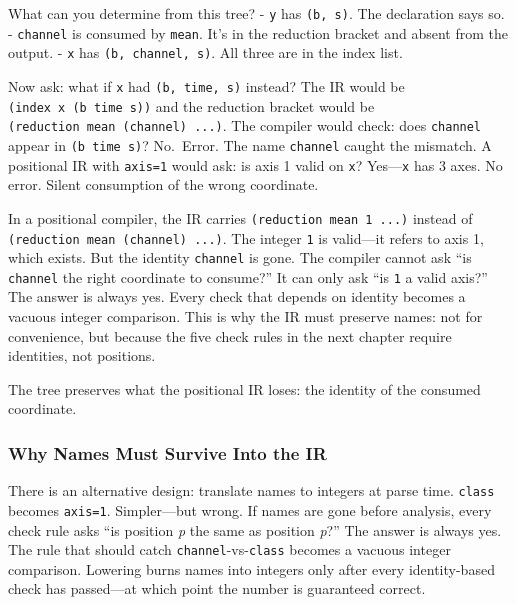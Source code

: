 \documentclass[11pt,titlepage]{article}
\begin{document}
What can you determine from this tree? - \texttt{y} has
\texttt{(b,\ s)}. The declaration says so. - \texttt{channel} is
consumed by \texttt{mean}. It's in the reduction bracket and absent from
the output. - \texttt{x} has \texttt{(b,\ channel,\ s)}. All three are
in the index list.

Now ask: what if \texttt{x} had \texttt{(b,\ time,\ s)} instead? The IR
would be \texttt{(index\ x\ (b\ time\ s))} and the reduction bracket
would be \texttt{(reduction\ mean\ (channel)\ ...)}. The compiler would
check: does \texttt{channel} appear in \texttt{(b\ time\ s)}? No.~Error.
The name \texttt{channel} caught the mismatch. A positional IR with
\texttt{axis=1} would ask: is axis 1 valid on \texttt{x}?
Yes---\texttt{x} has 3 axes. No error. Silent consumption of the wrong
coordinate.

In a positional compiler, the IR carries
\texttt{(reduction\ mean\ 1\ ...)} instead of
\texttt{(reduction\ mean\ (channel)\ ...)}. The integer \texttt{1} is
valid---it refers to axis 1, which exists. But the identity
\texttt{channel} is gone. The compiler cannot ask ``is \texttt{channel}
the right coordinate to consume?'' It can only ask ``is \texttt{1} a
valid axis?'' The answer is always yes. Every check that depends on
identity becomes a vacuous integer comparison. This is why the IR must
preserve names: not for convenience, but because the five check rules in
the next chapter require identities, not positions.

The tree preserves what the positional IR loses: the identity of the
consumed coordinate.

\vspace{2em}

\hypertarget{why-names-must-survive-into-the-ir}{%
\subsubsection{Why Names Must Survive Into the
IR}\label{why-names-must-survive-into-the-ir}}

There is an alternative design: translate names to integers at parse
time. \texttt{class} becomes \texttt{axis=1}. Simpler---but wrong. If
names are gone before analysis, every check rule asks ``is position
\emph{p} the same as position \emph{p}?'' The answer is always yes. The
rule that should catch \texttt{channel}-vs-\texttt{class} becomes a
vacuous integer comparison. Lowering burns names into integers only
after every identity-based check has passed---at which point the number
is guaranteed correct.
\end{document}
